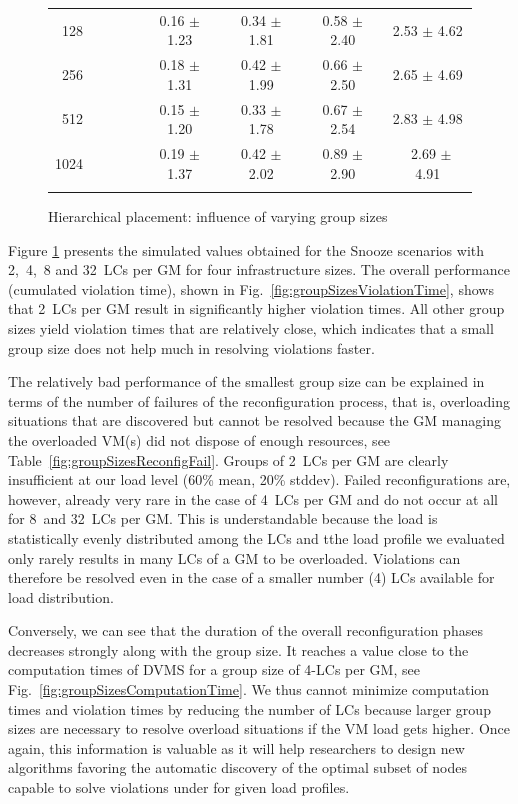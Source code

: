 \begin{figure}
\begin{minipage}{.66\textwidth}
{{\begin{tabular}[b]{|r@{\:}||@{\:}c@{\:}|@{\:}c@{\:}|@{\:}c@{\:}|@{\:}c@{\:}|}
        128~~~~~~~ &   0.16 $\pm$   1.23 &   0.34 $\pm$   1.81 &   0.58 $\pm$   2.40 &   2.53 $\pm$   4.62  \\
        256~~~~~~~ &   0.18 $\pm$   1.31 &   0.42 $\pm$   1.99 &   0.66 $\pm$   2.50 &   2.65 $\pm$   4.69  \\
        512~~~~~~~ &   0.15 $\pm$   1.20 &   0.33 $\pm$   1.78 &   0.67 $\pm$   2.54 &   2.83 $\pm$   4.98  \\
       1024~~~~~~~ &   0.19 $\pm$   1.37 &   0.42 $\pm$   2.02 &   0.89 $\pm$   2.90 &   ~2.69 $\pm$   4.91

      \Rstrut  \\ \hline
      \thickhline
  \end{tabular} }
  \label{fig:groupSizesComputationTime}
  }
\end{minipage}
\caption{Hierarchical placement: influence of varying group sizes}
\label{fig:snoozeGroupSizes}
\end{figure}



Figure \ref{fig:snoozeGroupSizes} presents the simulated values
obtained for the Snooze scenarios with 2,~4,~8 and 32~LCs per GM for four
infrastructure sizes. The overall performance (\ie cumulated violation
time), shown in Fig.~\ref{fig:groupSizesViolationTime}, shows that
2~LCs per GM result in significantly higher violation times. All other
group sizes yield violation times that are relatively close, which
indicates that a small group size does not help much in
resolving violations faster.

The relatively bad performance of the smallest group size can be
explained in terms of the number of failures of the reconfiguration
process, that is, overloading situations that are discovered but
cannot be resolved because the GM managing the overloaded VM(s) did
not dispose of enough resources, see
Table~\ref{fig:groupSizesReconfigFail}. Groups of 2~LCs per GM are
clearly insufficient at our load level (60\% mean, 20\% stddev).
Failed reconfigurations are, however, already very rare in the case of
4~LCs per GM and do not occur at all for 8~and 32~LCs per GM. This is
understandable because the load is statistically evenly distributed
among the LCs and tthe load profile we evaluated only rarely results
in many LCs of a GM to be overloaded. Violations can therefore be
resolved even in the case of a smaller number (4) LCs available for
load distribution.

Conversely, we can see that the duration of the overall
reconfiguration phases decreases strongly along with the group
size. It reaches a value close to the computation times of DVMS for a
group size of 4-LCs per GM, see Fig.~\ref{fig:groupSizesComputationTime}.
We thus cannot minimize computation times and violation times by
reducing the number of LCs because larger group sizes are necessary to
resolve overload situations if the VM load gets higher.  Once again,
this information is valuable as it will help researchers to design new
algorithms favoring the automatic discovery of the optimal subset of
nodes capable to solve violations under for given load profiles.

